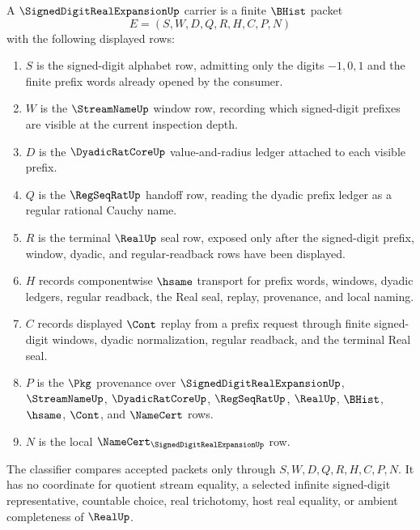 \begin{definition}
\label{def:signed-digit-real-expansion-carrier}
A $\SignedDigitRealExpansionUp$ carrier is a finite $\BHist$ packet
$$
E=(S,W,D,Q,R,H,C,P,N)
$$
with the following displayed rows:
\begin{enumerate}
\item $S$ is the signed-digit alphabet row, admitting only the digits $-1,0,1$ and the finite prefix words already opened by the consumer.
\item $W$ is the $\StreamNameUp$ window row, recording which signed-digit prefixes are visible at the current inspection depth.
\item $D$ is the $\DyadicRatCoreUp$ value-and-radius ledger attached to each visible prefix.
\item $Q$ is the $\RegSeqRatUp$ handoff row, reading the dyadic prefix ledger as a regular rational Cauchy name.
\item $R$ is the terminal $\RealUp$ seal row, exposed only after the signed-digit prefix, window, dyadic, and regular-readback rows have been displayed.
\item $H$ records componentwise $\hsame$ transport for prefix words, windows, dyadic ledgers, regular readback, the Real seal, replay, provenance, and local naming.
\item $C$ records displayed $\Cont$ replay from a prefix request through finite signed-digit windows, dyadic normalization, regular readback, and the terminal Real seal.
\item $P$ is the $\Pkg$ provenance over $\SignedDigitRealExpansionUp$, $\StreamNameUp$, $\DyadicRatCoreUp$, $\RegSeqRatUp$, $\RealUp$, $\BHist$, $\hsame$, $\Cont$, and $\NameCert$ rows.
\item $N$ is the local $\NameCert_{\SignedDigitRealExpansionUp}$ row.
\end{enumerate}
The classifier compares accepted packets only through $S,W,D,Q,R,H,C,P,N$. It has no coordinate for quotient stream equality, a selected infinite signed-digit representative, countable choice, real trichotomy, host real equality, or ambient completeness of $\RealUp$.
\end{definition}

